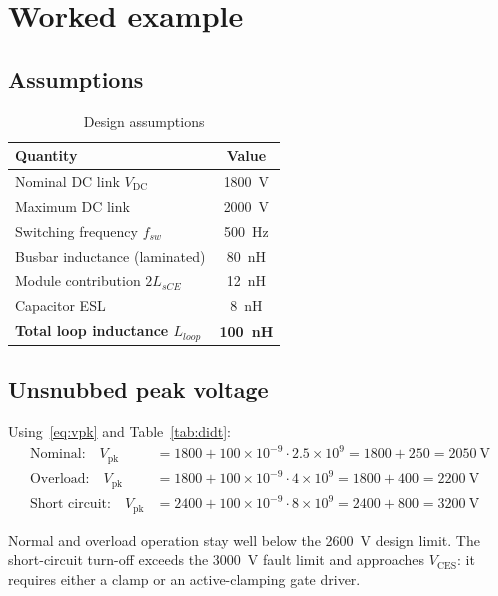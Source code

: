 \documentclass[11pt,a4paper]{article}
\newcommand{\Vces}{V_{\mathrm{CES}}}
\newcommand{\Vdc}{V_{\mathrm{DC}}}
\newcommand{\Vpk}{V_{\mathrm{pk}}}
\begin{document}
\section{Worked example}

\subsection{Assumptions}

\begin{table}[htbp]
\centering
\caption{Design assumptions}
\label{tab:assump}
\begin{tabular}{lc}
\toprule
Quantity & Value \\
\midrule
Nominal DC link $\Vdc$              & \SI{1800}{\volt} \\
Maximum DC link                      & \SI{2000}{\volt} \\
Switching frequency $f_{sw}$        & \SI{500}{\hertz} \\
Busbar inductance (laminated)        & \SI{80}{\nano\henry} \\
Module contribution $2L_{sCE}$      & \SI{12}{\nano\henry} \\
Capacitor ESL                        & \SI{8}{\nano\henry} \\
\textbf{Total loop inductance $L_{loop}$} & \textbf{\SI{100}{\nano\henry}} \\
\bottomrule
\end{tabular}
\end{table}

\subsection{Unsnubbed peak voltage}

Using~\eqref{eq:vpk} and Table~\ref{tab:didt}:
\begin{align}
\text{Nominal:}\quad
\Vpk &= 1800 + 100\times10^{-9}\cdot 2.5\times10^{9}
      = 1800 + 250 = \SI{2050}{\volt} \\
\text{Overload:}\quad
\Vpk &= 1800 + 100\times10^{-9}\cdot 4\times10^{9}
      = 1800 + 400 = \SI{2200}{\volt} \\
\text{Short circuit:}\quad
\Vpk &= 2400 + 100\times10^{-9}\cdot 8\times10^{9}
      = 2400 + 800 = \SI{3200}{\volt}
\end{align}

Normal and overload operation stay well below the \SI{2600}{\volt} design
limit. The short-circuit turn-off exceeds the \SI{3000}{\volt} fault limit and
approaches $\Vces$: it requires either a clamp or an active-clamping gate
driver.
\end{document}
